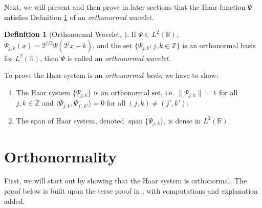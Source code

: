 \documentclass[11pt]{amsart}
\theoremstyle{theorem} %
\theoremstyle{definition}
\newtheorem{defn}[thm]{Definition}
\theoremstyle{example}
\theoremstyle{remark}
\numberwithin{equation}{section}
\newcommand{\R}{\mathbb{R}}
\newcommand{\Z}{\mathbb{Z}}
\DeclareMathOperator{\spn}{span}
\begin{document}
Next, we will present and then prove in later sections that the Haar function $ \varPsi $ satisfies Definition \ref{def:wavelet} of an \emph{orthonormal wavelet}.

\begin{defn}[Orthonormal Wavelet, {\cite[303]{pinsky}}] \label{def:wavelet}
	If $ \varPsi \in L^2(\R) $, $ \varPsi_{j,k}(x) = 2^{j/2} \varPsi (2^j x-k) $, and the set $ \{ \varPsi_{j,k}: j,k \in \Z \} $ is an orthonormal basis for $ L^2(\R) $, then $ \varPsi $ is called an \emph{orthonormal wavelet}.
\end{defn}

To prove the Haar system is an \textit{orthonormal basis}, we have to show:
	\begin{enumerate}
		\item The Haar system $ \{ \varPsi_{j,k} \} $ is an orthonormal set, i.e. $ \| \varPsi_{j,k} \| = 1 $ for all $ j,k \in \Z $ and $ \langle \varPsi_{j,k}, \varPsi_{j',k'} \rangle = 0 $ for all $ (j,k) \neq (j',k') $.
		
		\item The span of Haar system, denoted $ \spn\{\varPsi_{j,k}\} $, is dense in $ L^2(\R) $.
	\end{enumerate}

\section{Orthonormality} \label{section:orthonormality}
First, we will start out by showing that the Haar system is orthonormal. The proof below is built upon the terse proof in \cite{davidson}, with computations and explanation added.
\end{document}
